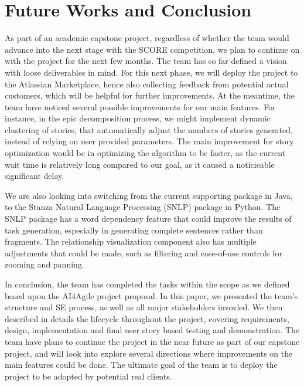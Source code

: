 \section{Future Works and Conclusion}
\label{conclusion}
As part of an academic capstone project, regardless of whether the team would advance into the next stage with the SCORE competition, we plan to continue on with the project for the next few months. The team has so far defined a vision with loose deliverables in mind. For this next phase, we will deploy the project to the Atlassian Marketplace, hence also collecting feedback from potential actual customers, which will be helpful for further improvements.  At the meantime, the team have noticed several possible improvements for our main features. For instance, in the epic decomposition process, we might implement dynamic clustering of stories, that automatically adjust the numbers of stories generated, instead of relying on user provided parameters. The main improvement for story optimization would be in optimizing the algorithm to be faster, as the current wait time is relatively long compared to our goal, as it caused a noticieable significant delay. 

We are also looking into switching from the current supporting package in Java, to the Stanza Natural Language Processing (SNLP) \cite{NLP1} package in Python. The SNLP package has a word dependency feature that could improve the results of task generation, especially in generating complete sentences rather than fragments. The relationship visualization component also has multiple adjustments that could be made, such as filtering and ease-of-use controls for zooming and panning. 

In conclusion, the team has completed the tasks within the scope as we defined based upon the AI4Agile project proposal. In this paper, we presented the team's structure and SE process, as well as all major stakeholders invovled. We then described in details the lifecycle throughout the project, covering requirements, design, implementation and final user story based testing and demonstration. The team have plans to continue the project in the near future as part of our capstone project, and will look into explore several directions where improvements on the main features could be done. The ultimate goal of the team is to deploy the project to be adopted by potential real clients. 